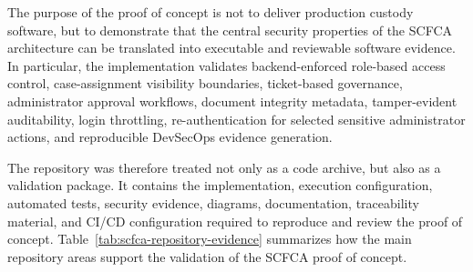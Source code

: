 \documentclass[12pt,a4paper]{report}
\begin{document}
The purpose of the proof of concept is not to deliver production custody software, but to demonstrate that the central security properties of the SCFCA architecture can be translated into executable and reviewable software evidence. In particular, the implementation validates backend-enforced role-based access control, case-assignment visibility boundaries, ticket-based governance, administrator approval workflows, document integrity metadata, tamper-evident auditability, login throttling, re-authentication for selected sensitive administrator actions, and reproducible DevSecOps evidence generation.

The repository was therefore treated not only as a code archive, but also as a validation package. It contains the implementation, execution configuration, automated tests, security evidence, diagrams, documentation, traceability material, and CI/CD configuration required to reproduce and review the proof of concept. Table~\ref{tab:scfca-repository-evidence} summarizes how the main repository areas support the validation of the SCFCA proof of concept.
\end{document}
